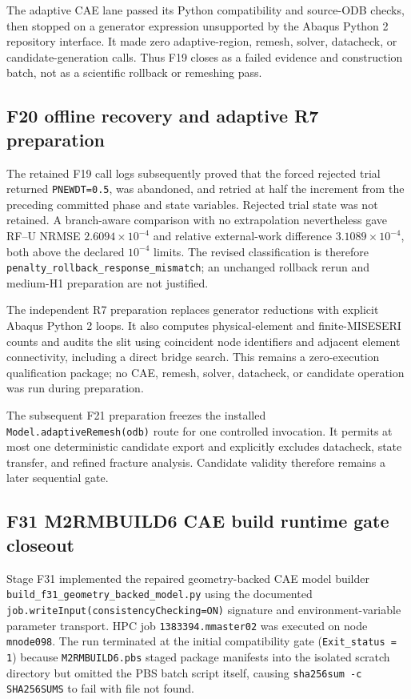 The adaptive CAE lane passed its Python compatibility and source-ODB checks,
then stopped on a generator expression unsupported by the Abaqus Python 2
repository interface. It made zero adaptive-region, remesh, solver,
datacheck, or candidate-generation calls. Thus F19 closes as a failed evidence
and construction batch, not as a scientific rollback or remeshing pass.

\subsection{F20 offline recovery and adaptive R7 preparation}

The retained F19 call logs subsequently proved that the forced rejected trial
returned \texttt{PNEWDT=0.5}, was abandoned, and retried at half the increment
from the preceding committed phase and state variables. Rejected trial state
was not retained. A branch-aware comparison with no extrapolation nevertheless
gave RF--U NRMSE $2.6094\times10^{-4}$ and relative external-work difference
$3.1089\times10^{-4}$, both above the declared $10^{-4}$ limits. The revised
classification is therefore \texttt{penalty\_rollback\_response\_mismatch}; an
unchanged rollback rerun and medium-H1 preparation are not justified.

The independent R7 preparation replaces generator reductions with explicit
Abaqus Python 2 loops. It also computes physical-element and finite-MISESERI
counts and audits the slit using coincident node identifiers and adjacent
element connectivity, including a direct bridge search. This remains a
zero-execution qualification package; no CAE, remesh, solver, datacheck, or
candidate operation was run during preparation.

The subsequent F21 preparation freezes the installed
\texttt{Model.adaptiveRemesh(odb)} route for one controlled invocation.  It
permits at most one deterministic candidate export and explicitly excludes
datacheck, state transfer, and refined fracture analysis.  Candidate validity
therefore remains a later sequential gate.

\subsection{F31 M2RMBUILD6 CAE build runtime gate closeout}

Stage F31 implemented the repaired geometry-backed CAE model builder \texttt{build\_f31\_geometry\_backed\_model.py} using the documented \texttt{job.writeInput(consistencyChecking=ON)} signature and environment-variable parameter transport. HPC job \texttt{1383394.mmaster02} was executed on node \texttt{mnode098}. The run terminated at the initial compatibility gate (\texttt{Exit\_status = 1}) because \texttt{M2RMBUILD6.pbs} staged package manifests into the isolated scratch directory but omitted the PBS batch script itself, causing \texttt{sha256sum -c SHA256SUMS} to fail with file not found.

